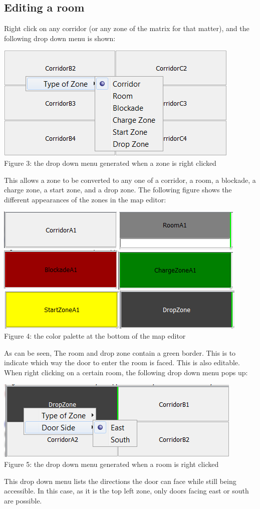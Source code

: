 \subsection{Editing a room}
Right click on any corridor (or any zone of the matrix for that matter), and the following drop down menu is shown:
\begin{center}
	\centering
	\includegraphics[scale=0.55]{EnvironmentStore/DropDownMenuRoom.png}\\
	Figure 3: the drop down menu generated when a zone is right clicked
\end{center}
This allows a zone to be converted to any one of a corridor, a room, a blockade, a charge zone, a start zone, and a drop zone. The following figure shows the different appearances of the zones in the map editor:
\begin{center}
	\centering
	\includegraphics{EnvironmentStore/DifferentRooms.png}\\
	Figure 4: the color palette at the bottom of the map editor
\end{center}
As can be seen, The room and drop zone contain a green border. This is to indicate which way the door to enter the room is faced. This is also editable. When right clicking on a certain room, the following drop down menu pops up:
\begin{center}
	\centering
	\includegraphics{EnvironmentStore/DropDownMenuRoom2.png}\\
	Figure 5: the drop down menu generated when a room is right clicked
\end{center}
This drop down menu lists the directions the door can face while still being accessible. In this case, as it is the top left zone, only doors facing east or south are possible.
